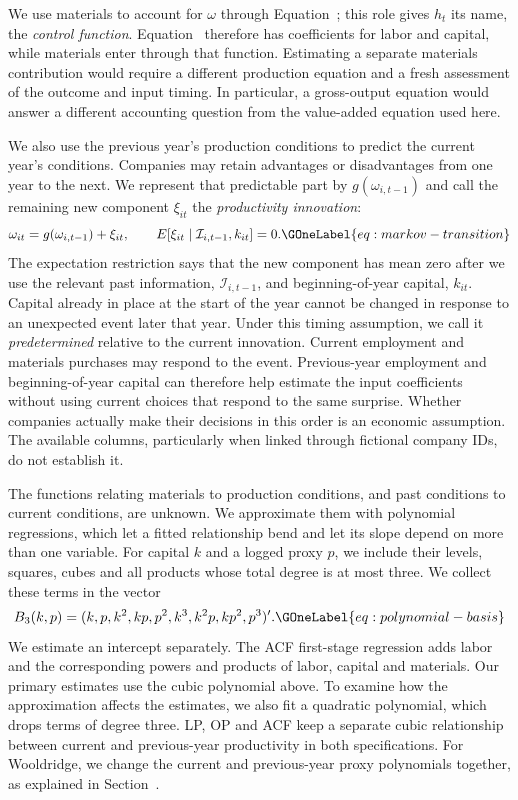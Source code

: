 We use materials to account for $\omega$ through Equation~; this role gives $h_t$ its name, the \emph{control function}. Equation~ therefore has coefficients for labor and capital, while materials enter through that function. Estimating a separate materials contribution would require a different production equation and a fresh assessment of the outcome and input timing. In particular, a gross-output equation would answer a different accounting question from the value-added equation used here.

We also use the previous year's production conditions to predict the current year's conditions. Companies may retain advantages or disadvantages from one year to the next. We represent that predictable part by $g(\omega_{i,t-1})$ and call the remaining new component $\xi_{it}$ the \emph{productivity innovation}:
\begin{equation}
\omega_{it}=g(\omega_{i,t-1})+\xi_{it},\qquad
E[\xi_{it}\mid\mathcal I_{i,t-1},k_{it}]=0.
\GOneLabel{eq:markov-transition}
\end{equation}
The expectation restriction says that the new component has mean zero after we use the relevant past information, $\mathcal I_{i,t-1}$, and beginning-of-year capital, $k_{it}$. Capital already in place at the start of the year cannot be changed in response to an unexpected event later that year. Under this timing assumption, we call it \emph{predetermined} relative to the current innovation. Current employment and materials purchases may respond to the event. Previous-year employment and beginning-of-year capital can therefore help estimate the input coefficients without using current choices that respond to the same surprise. Whether companies actually make their decisions in this order is an economic assumption. The available columns, particularly when linked through fictional company IDs, do not establish it.

The functions relating materials to production conditions, and past conditions to current conditions, are unknown. We approximate them with polynomial regressions, which let a fitted relationship bend and let its slope depend on more than one variable. For capital $k$ and a logged proxy $p$, we include their levels, squares, cubes and all products whose total degree is at most three. We collect these terms in the vector
\begin{equation}
B_3(k,p)=(k,p,k^2,kp,p^2,k^3,k^2p,kp^2,p^3)' .
\GOneLabel{eq:polynomial-basis}
\end{equation}
We estimate an intercept separately. The ACF first-stage regression adds labor and the corresponding powers and products of labor, capital and materials. Our primary estimates use the cubic polynomial above. To examine how the approximation affects the estimates, we also fit a quadratic polynomial, which drops terms of degree three. LP, OP and ACF keep a separate cubic relationship between current and previous-year productivity in both specifications. For Wooldridge, we change the current and previous-year proxy polynomials together, as explained in Section~.

